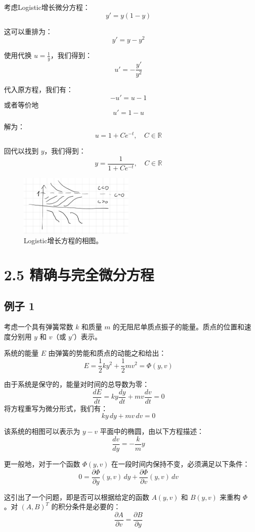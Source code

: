 \documentclass{ctexart}
\begin{document}
考虑Logistic增长微分方程：
\[ y' = y(1-y) \]

这可以重排为：
\[ y' = y - y^2 \]

使用代换 \( u = \frac{1}{y} \)，我们得到：
\[ u' = -\frac{y'}{y^2} \]

代入原方程，我们有：
\[ -u' = u - 1 \]
或者等价地
\[ u' = 1 - u \]

解为：
\[ u = 1 + Ce^{-t}, \quad C \in \mathbb{R} \]

回代以找到 \( y \)，我们得到：
\[ y = \frac{1}{1 + Ce^{-t}}, \quad C \in \mathbb{R} \]

\begin{figure}[h!]
\centering
\includegraphics[width=0.5\textwidth]{phase_diagram.png}
\caption{Logistic增长方程的相图。}
\end{figure}


\section*{2.5 精确与完全微分方程}
\subsection*{例子 1}
考虑一个具有弹簧常数 \( k \) 和质量 \( m \) 的无阻尼单质点振子的能量。质点的位置和速度分别用 \( y \) 和 \( v \)（或 \( y' \)）表示。

系统的能量 \( E \) 由弹簧的势能和质点的动能之和给出：
\[
E = \frac{1}{2}k y^2 + \frac{1}{2}m v^2 = \Phi(y,v)
\]

由于系统是保守的，能量对时间的总导数为零：
\[
\frac{dE}{dt} = k y \frac{dy}{dt} + m v \frac{dv}{dt} = 0
\]
将方程重写为微分形式，我们有：
\[
k y \, dy + m v \, dv = 0
\]

该系统的相图可以表示为 \( y-v \) 平面中的椭圆，由以下方程描述：
\[
\frac{dv}{dy} = -\frac{k}{m}y
\]

更一般地，对于一个函数 \( \Phi(y,v) \) 在一段时间内保持不变，必须满足以下条件：
\[
0 = \frac{\partial \Phi}{\partial y}(y,v) \, dy + \frac{\partial \Phi}{\partial v}(y,v) \, dv
\]

这引出了一个问题，即是否可以根据给定的函数 \( A(y,v) \) 和 \( B(y,v) \) 来重构 \( \Phi \)。对 \( (A,B)^T \) 的积分条件是必要的：
\[
\frac{\partial A}{\partial v} = \frac{\partial B}{\partial y}
\]
\end{document}
